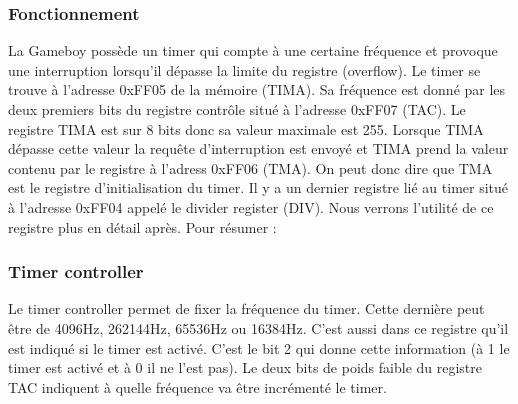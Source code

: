 \documentclass[a4paper]{article}
\begin{document}
\subsubsection{Fonctionnement}
La Gameboy possède un timer qui compte à une certaine fréquence et provoque une
interruption lorsqu'il dépasse la limite du registre (overflow). Le timer se trouve
à l'adresse 0xFF05 de la mémoire (TIMA). Sa fréquence est donné par les deux premiers
bits du registre contrôle situé à l'adresse 0xFF07 (TAC). Le registre TIMA est sur 8 bits donc
sa valeur maximale est 255. Lorsque TIMA dépasse cette valeur la requête d'interruption
est envoyé et TIMA prend la valeur contenu par le registre à l'adress 0xFF06 (TMA).
On peut donc dire que TMA est le registre d'initialisation du timer. Il y a un
dernier registre lié au timer situé à l'adresse 0xFF04 appelé le divider register
(DIV). Nous verrons l'utilité de ce registre plus en détail après. Pour résumer :
\begin{center}
\end{center}

\subsubsection{Timer controller}
Le timer controller permet de fixer la fréquence du timer. Cette dernière peut être
de 4096Hz, 262144Hz, 65536Hz ou 16384Hz. C'est aussi dans ce registre qu'il est indiqué
si le timer est activé. C'est le bit 2 qui donne cette information (à 1 le timer
est activé et à 0 il ne l'est pas). Le deux bits de poids faible du registre TAC
indiquent à quelle fréquence va être incrémenté le timer.
\begin{center}
\end{center}
\end{document}
